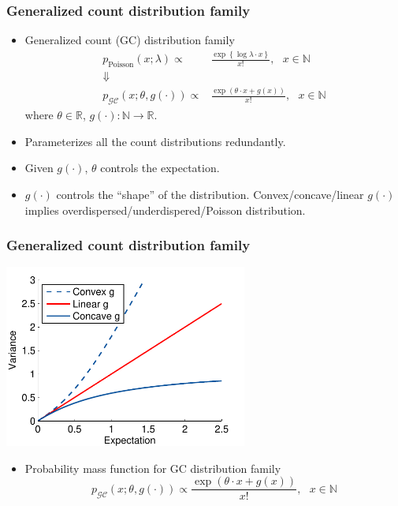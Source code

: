 \documentclass[16pt,presentation]{beamer}
\begin{document}
\begin{frame}
\frametitle{Generalized count distribution family}
\begin{itemize}
\item Generalized count (GC) distribution family
\[\begin{split}
p_{\text{Poisson}}(x; \lambda) \propto& \frac{\exp\left\{\log{\lambda} \cdot x\right\}}{x!},~~~x \in \mathbb{N}\\
\Downarrow&\\
p_{\mathcal{GC}}(x; \theta, g(\cdot)) \propto& \frac{\exp(\theta \cdot x + g(x) )}{x!}, ~~~x \in \mathbb{N}
\end{split}\]
where $\theta \in \mathbb{R}$, $g(\cdot): \mathbb{N} \rightarrow \mathbb{R}$.
\item Parameterizes \alert{all} the count distributions \alert{redundantly}.
\item Given $g(\cdot)$, $\theta$ controls the expectation.
\item $g(\cdot)$ controls the ``shape'' of the distribution. Convex/concave/linear $g(\cdot)$ implies overdispersed/underdispered/Poisson distribution.
\end{itemize}
\end{frame}


\begin{frame}
\frametitle{Generalized count distribution family}
\begin{center}
\includegraphics[width = 0.60\textwidth]{./figs/gclds/fig_var_GPoiss.pdf}
\end{center}
\begin{itemize}
\item Probability mass function for GC distribution family
\[p_{\mathcal{GC}}(x; \theta, g(\cdot)) \propto \frac{\exp(\theta \cdot x + g(x) )}{x!}, ~~~x \in \mathbb{N}\]
\end{itemize}
\end{frame}
\end{document}
